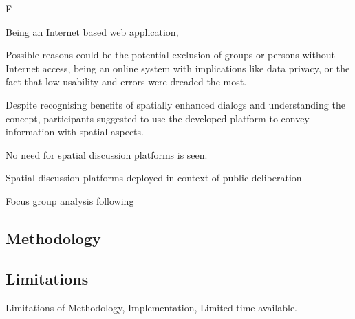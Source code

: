 F


Being an Internet based web application, 

Possible reasons could be the potential exclusion of groups or persons without Internet access,
being an online system with implications like data privacy, or the fact that low usability and errors were dreaded the most.    %




Despite recognising benefits of spatially enhanced dialogs and understanding the concept, participants suggested to use the developed platform to convey information with spatial aspects.



No need for spatial discussion platforms is seen.



Spatial discussion platforms deployed in context of public deliberation




Focus group analysis following \cite{asbury1995overview}

\subsection{Methodology}
\label{sub:method-discussion}

\subsection{Limitations}
\label{sub:limitations}

Limitations of Methodology, Implementation, Limited time available.


